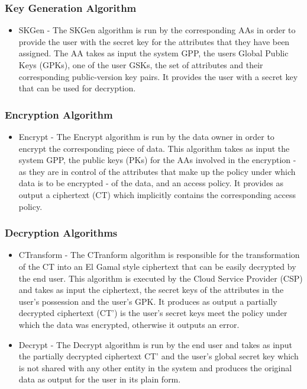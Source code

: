 \subsubsection*{Key Generation Algorithm}
\begin{itemize}
	\item SKGen - The SKGen algorithm is run by the corresponding AAs in order to provide the user with the secret key for the attributes that they have been assigned. The AA takes as input the system GPP, the users Global Public Keys (GPKs), one of the user GSKs, the set of attributes and their corresponding public-version key pairs. It provides the user with a secret key that can be used for decryption.
\end{itemize}

\subsubsection*{Encryption Algorithm}
\begin{itemize}
	\item Encrypt - The Encrypt algorithm is run by the data owner in order to encrypt the corresponding piece of data. This algorithm takes as input the system GPP, the public keys (PKs) for the AAs involved in the encryption - as they are in control of the attributes that make up the policy under which data is to be encrypted - of the data, and an access policy. It provides as output a ciphertext (CT) which implicitly contains the corresponding access policy.
\end{itemize}

\subsubsection*{Decryption Algorithms}
\begin{itemize}
	\item CTransform - The CTranform algorithm is responsible for the transformation of the CT into an El Gamal style ciphertext that can be easily decrypted by the end user. This algorithm is executed by the Cloud Service Provider (CSP) and takes as input the ciphertext, the secret keys of the attributes in the user's possession and the user's GPK. It produces as output a partially decrypted ciphertext (CT') is the user's secret keys meet the policy under which the data was encrypted, otherwise it outputs an error.
	
	\item Decrypt - The Decrypt algorithm is run by the end user and takes as input the partially decrypted ciphertext CT' and the user's global secret key which is not shared with any other entity in the system and produces the original data as output for the user in its plain form.
\end{itemize}

